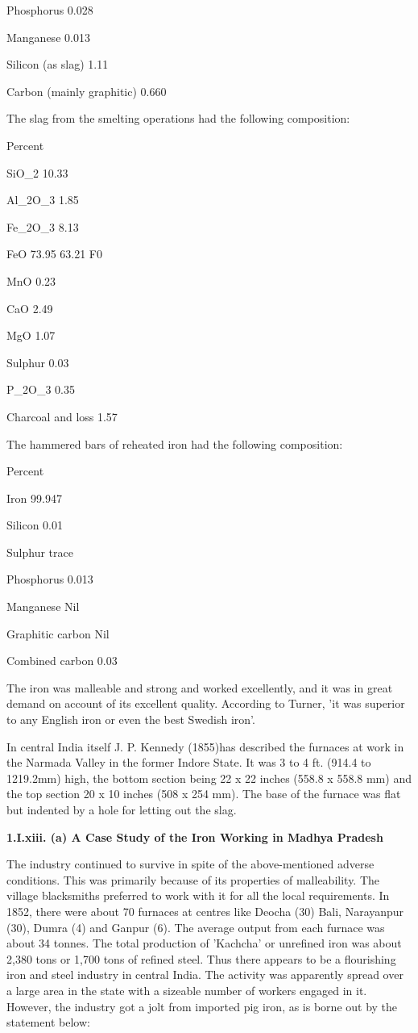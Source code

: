 Phosphorus 0.028

Manganese 0.013

Silicon (as slag) 1.11

Carbon (mainly graphitic) 0.660

The slag from the smelting operations had the following composition:

Percent

SiO_2 10.33

Al_2O_3 1.85

Fe_2O_3 8.13

FeO 73.95 63.21 F0

MnO 0.23

CaO 2.49

MgO 1.07

Sulphur 0.03

P_2O_3 0.35

Charcoal and loss 1.57

The hammered bars of reheated iron had the following composition:

Percent

Iron 99.947

Silicon 0.01

Sulphur trace

Phosphorus 0.013

Manganese Nil

Graphitic carbon Nil

Combined carbon 0.03

The iron was malleable and strong and worked excellently, and it was in great demand on account of its excellent quality. According to Turner, 'it was superior to any English iron or even the best Swedish iron'.

In central India itself J. P. Kennedy (1855)has described the furnaces at work in the Narmada Valley in the former Indore State. It was 3 to 4 ft. (914.4 to 1219.2mm) high, the bottom section being 22 x 22 inches (558.8 x 558.8 mm) and the top section 20 x 10 inches (508 x 254 mm). The base of the furnace was flat but indented by a hole for letting out the slag.

\textbf{1.I.xiii. (a) A Case Study of the Iron Working in Madhya Pradesh}

The industry continued to survive in spite of the above-mentioned adverse conditions. This was primarily because of its properties of malleability. The village blacksmiths preferred to work with it for all the local requirements. In 1852, there were about 70 furnaces at centres like Deocha (30) Bali, Narayanpur (30), Dumra (4) and Ganpur (6). The average output from each furnace was about 34 tonnes. The total production of 'Kachcha' or unrefined iron was about 2,380 tons or 1,700 tons of refined steel. Thus there appears to be a flourishing iron and steel industry in central India. The activity was apparently spread over a large area in the state with a sizeable number of workers engaged in it. However, the industry got a jolt from imported pig iron, as is borne out by the statement below:

